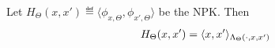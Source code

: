 \begin{lemma}
Let $H_{\Theta}(x,x')\eqdef\langle\phi_{x,\Theta},\phi_{x',\Theta} \rangle$ be the NPK. Then  
\begin{align*} 
H_{\Theta}(x,x')=\langle x,x'\rangle_{\Lambda_{\Theta}(\cdot,x,x')} 
\end{align*}
\end{lemma}

